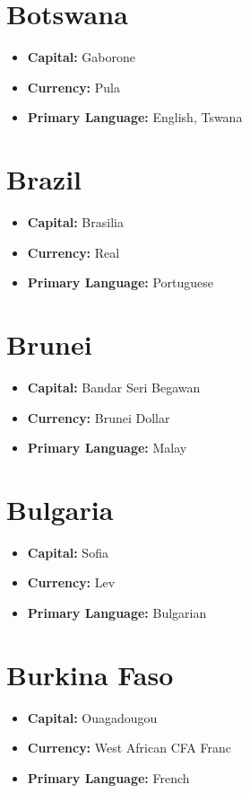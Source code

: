 \documentclass[a4paper,100pt,twoside]{book}
\begin{document}
\section*{\Huge Botswana}
\vspace{5mm} %
\begin{itemize}
	\item \textbf{Capital:} Gaborone
	\item \textbf{Currency:} Pula
	\item \textbf{Primary Language:} English, Tswana
\end{itemize}

\section*{\Huge Brazil}
\vspace{5mm} %
\begin{itemize}
	\item \textbf{Capital:} Brasilia
	\item \textbf{Currency:} Real
	\item \textbf{Primary Language:} Portuguese
\end{itemize}

\section*{\Huge Brunei}
\vspace{5mm} %
\begin{itemize}
	\item \textbf{Capital:} Bandar Seri Begawan
	\item \textbf{Currency:} Brunei Dollar
	\item \textbf{Primary Language:} Malay
\end{itemize}

\section*{\Huge Bulgaria}
\vspace{5mm} %
\begin{itemize}
	\item \textbf{Capital:} Sofia
	\item \textbf{Currency:} Lev
	\item \textbf{Primary Language:} Bulgarian
\end{itemize}

\section*{\Huge Burkina Faso}
\vspace{5mm} %
\begin{itemize}
	\item \textbf{Capital:} Ouagadougou
	\item \textbf{Currency:} West African CFA Franc
	\item \textbf{Primary Language:} French
\end{itemize}
\end{document}
